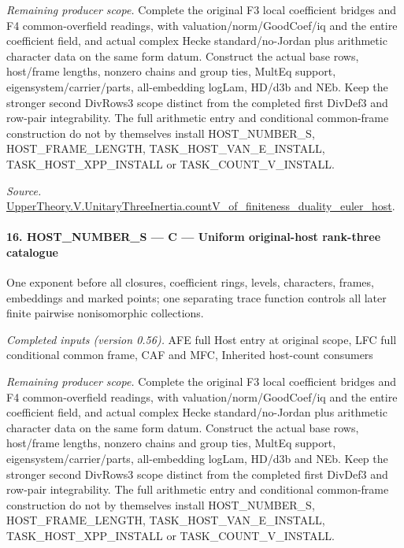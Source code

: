\documentclass[11pt,a4paper]{article}
\numberwithin{equation}{section}
\theoremstyle{remark}\newtheorem{remark}[theorem]{Remark}
\begin{document}
\emph{Remaining producer scope.} Complete the original F3 local coefficient bridges and F4 common-overfield readings, with valuation/norm/GoodCoef/iq and the entire coefficient field, and actual complex Hecke standard/no-Jordan plus arithmetic character data on the same form datum. Construct the actual base rows, host/frame lengths, nonzero chains and group ties, MultEq support, eigensystem/carrier/parts, all-embedding logLam, HD/d3b and NEb. Keep the stronger second DivRows3 scope distinct from the completed first DivDef3 and row-pair integrability. The full arithmetic entry and conditional common-frame construction do not by themselves install HOST\_\allowbreak NUMBER\_\allowbreak S, HOST\_\allowbreak FRAME\_\allowbreak LENGTH, TASK\_\allowbreak HOST\_\allowbreak VAN\_\allowbreak E\_\allowbreak INSTALL, TASK\_\allowbreak HOST\_\allowbreak XPP\_\allowbreak INSTALL or TASK\_\allowbreak COUNT\_\allowbreak V\_\allowbreak INSTALL.

\emph{Source.} \href{https://github.com/CocoSgt/riemann-hypothesis-lean/blob/7cbf7a0c32fca1badf05931879a37c3f8a2b03b4/src/Development/AutomorphicArithmetic/AutomorphicVarieties/ModularityArgument/ThresholdArguments/DenseThresholdCases/CountVOf.lean#L33-L60}{UpperTheory.V.UnitaryThreeInertia.countV\_\allowbreak of\_\allowbreak finiteness\_\allowbreak duality\_\allowbreak euler\_\allowbreak host}.



\paragraph{16. HOST\_\allowbreak NUMBER\_\allowbreak S — C — Uniform original-host rank-three catalogue}

One exponent before all closures, coefficient rings, levels, characters, frames, embeddings and marked points; one separating trace function controls all later finite pairwise nonisomorphic collections.

\emph{Completed inputs (version 0.56).} AFE full Host entry at original scope, LFC full conditional common frame, CAF and MFC, Inherited host-count consumers

\emph{Remaining producer scope.} Complete the original F3 local coefficient bridges and F4 common-overfield readings, with valuation/norm/GoodCoef/iq and the entire coefficient field, and actual complex Hecke standard/no-Jordan plus arithmetic character data on the same form datum. Construct the actual base rows, host/frame lengths, nonzero chains and group ties, MultEq support, eigensystem/carrier/parts, all-embedding logLam, HD/d3b and NEb. Keep the stronger second DivRows3 scope distinct from the completed first DivDef3 and row-pair integrability. The full arithmetic entry and conditional common-frame construction do not by themselves install HOST\_\allowbreak NUMBER\_\allowbreak S, HOST\_\allowbreak FRAME\_\allowbreak LENGTH, TASK\_\allowbreak HOST\_\allowbreak VAN\_\allowbreak E\_\allowbreak INSTALL, TASK\_\allowbreak HOST\_\allowbreak XPP\_\allowbreak INSTALL or TASK\_\allowbreak COUNT\_\allowbreak V\_\allowbreak INSTALL.
\end{document}
